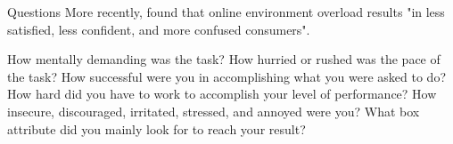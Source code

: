 Questions
More recently, \cite{Chen2009} found that online environment overload results "in less satisfied, less confident, and
more confused consumers".


How mentally demanding was the task?
How hurried or rushed was the pace of the task?
How successful were you in accomplishing what you were asked to do?
How hard did you have to work to accomplish your level of performance?
How insecure, discouraged, irritated, stressed, and annoyed were you?
What box attribute did you mainly look for to reach your result?
